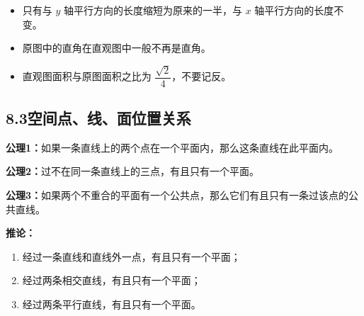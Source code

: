 \documentclass[12pt, a4paper]{ctexart}
\begin{document}
\begin{center}
\end{center}

\begin{warnbox}[易错提醒]
\begin{itemize}[leftmargin=2em]
  \item 只有与 $y$ 轴平行方向的长度缩短为原来的一半，与 $x$ 轴平行方向的长度不变。
  \item 原图中的直角在直观图中一般不再是直角。
  \item 直观图面积与原图面积之比为 $\dfrac{\sqrt{2}}{4}$，不要记反。
\end{itemize}
\end{warnbox}

\subsection*{8.3\quad 空间点、线、面位置关系}

\begin{knowledgebox}[【知识6】平面的基本性质（公理）]
\textbf{公理1：}如果一条直线上的两个点在一个平面内，那么这条直线在此平面内。

\textbf{公理2：}过不在同一条直线上的三点，有且只有一个平面。

\textbf{公理3：}如果两个不重合的平面有一个公共点，那么它们有且只有一条过该点的公共直线。

\medskip
\textbf{推论：}
\begin{enumerate}[leftmargin=2em]
  \item 经过一条直线和直线外一点，有且只有一个平面；
  \item 经过两条相交直线，有且只有一个平面；
  \item 经过两条平行直线，有且只有一个平面。
\end{enumerate}
\end{knowledgebox}
\end{document}
